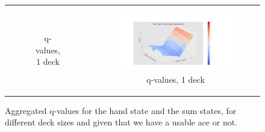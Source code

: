\begin{landscape}
\begin{figure}[htp]
\begin{tabular}{cc}
\begin{subfigure}[b]{1\textwidth}
   \caption{q-values, 1 deck \label{sfig:3Dnd3}}
\end{subfigure}\hspace{-4cm}
&
\begin{subfigure}[b]{1\textwidth}
  	 \includegraphics[width=\textwidth]{./figures/noace_3D_sum_1_decks.png}
   \caption{q-values, 1 deck \label{sfig:3Dnd4}}
\end{subfigure}
\end{tabular}
\caption{Aggregated q-values for the hand state and the sum states, for different deck sizes and given that we have a 
         usable ace or not.} \label{fig:3Dq-vals}
\end{figure}
\end{landscape}